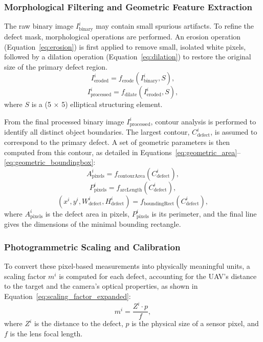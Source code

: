 \documentclass[energies,article,submit,pdftex,moreauthors]{Definitions/mdpi}
\begin{document}
\subsubsection{Morphological Filtering and Geometric Feature Extraction}
The raw binary image \(I^i_{\text{binary}}\) may contain small spurious artifacts. To refine the defect mask, morphological operations are performed. An erosion operation (Equation~\ref{eq:erosion}) is first applied to remove small, isolated white pixels, followed by a dilation operation (Equation~\ref{eq:dilation}) to restore the original size of the primary defect region.
\begin{equation}
    I^i_{\text{eroded}} = f_{\text{erode}}(I^i_{\text{binary}}, S),
    \label{eq:erosion}
\end{equation}
\begin{equation}
    I^i_{\text{processed}} = f_{\text{dilate}}(I^i_{\text{eroded}}, S),
    \label{eq:dilation}
\end{equation}
where \(S\) is a (5 \(\times\) 5) elliptical structuring element.

From the final processed binary image \(I^i_{\text{processed}}\), contour analysis is performed to identify all distinct object boundaries. The largest contour, \(C^i_{\text{defect}}\), is assumed to correspond to the primary defect. A set of geometric parameters is then computed from this contour, as detailed in Equations~\ref{eq:geometric_area}--\ref{eq:geometric_boundingbox}:
\begin{equation}
    A^i_{\text{pixels}} = f_{\text{contourArea}}(C^i_{\text{defect}}),
    \label{eq:geometric_area}
\end{equation}
\begin{equation}
    P^i_{\text{pixels}} = f_{\text{arcLength}}(C^i_{\text{defect}}),
    \label{eq:geometric_perimeter}
\end{equation}
\begin{equation}
    (x^i, y^i, W^i_{\text{defect}}, H^i_{\text{defect}}) = f_{\text{boundingRect}}(C^i_{\text{defect}}),
    \label{eq:geometric_boundingbox}
\end{equation}
where \(A^i_{\text{pixels}}\) is the defect area in pixels, \(P^i_{\text{pixels}}\) is its perimeter, and the final line gives the dimensions of the minimal bounding rectangle.

\subsubsection{Photogrammetric Scaling and Calibration}
To convert these pixel-based measurements into physically meaningful units, a scaling factor \(m^i\) is computed for each defect, accounting for the UAV's distance to the target and the camera's optical properties, as shown in Equation~\ref{eq:scaling_factor_expanded}:
\begin{equation}
    m^i = \frac{Z^i \cdot p}{f},
    \label{eq:scaling_factor_expanded}
\end{equation}
where \(Z^i\) is the distance to the defect, \(p\) is the physical size of a sensor pixel, and \(f\) is the lens focal length.
\end{document}
